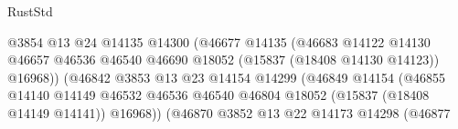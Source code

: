 \begin{lexlean}{RustStd}
\begin{coremodule}
{\begin{coremodule}
{{{{{{{{{{{{{{{{{{{{{{{{{{{{{{{{{{{{{{{{{{{{{{{{{{{{{{{{{{{{                                                    @3854
                                                    @13
                                                    @24
                                                    @14135
                                                    @14300
                                                    (@46677
                                                      @14135
                                                      (@46683
                                                        @14122
                                                        @14130
                                                        @46657
                                                        @46536
                                                        @46540
                                                        @46690
                                                        @18052
                                                        (@15837 (@18408 @14130 @14123))
                                                        @16968))
                                                    (@46842
                                                      @3853
                                                      @13
                                                      @23
                                                      @14154
                                                      @14299
                                                      (@46849
                                                        @14154
                                                        (@46855
                                                          @14140
                                                          @14149
                                                          @46532
                                                          @46536
                                                          @46540
                                                          @46804
                                                          @18052
                                                          (@15837 (@18408 @14149 @14141))
                                                          @16968))
                                                      (@46870
                                                        @3852
                                                        @13
                                                        @22
                                                        @14173
                                                        @14298
                                                        (@46877
}}}}}}}}}}}}}}}}}}}}}}}}}}}}}}}}}}}}}}}}}}}}}}}}}}}}}}}}}}}}
\end{coremodule}}
\end{coremodule}
\end{lexlean}
